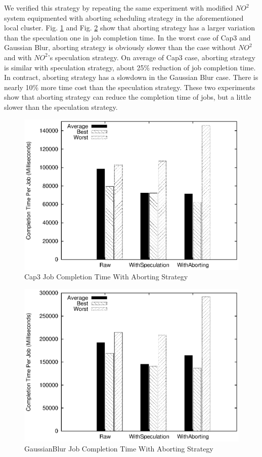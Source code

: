 We verified this strategy by repeating the same experiment with modified $NO^2$ system equipmented with aborting scheduling strategy in the aforementioned local cluster. Fig. \ref{figure:abort_completiontime_cap3} and Fig. \ref{figure:abort_completiontime_gaussianblur} show that aborting strategy has a larger variation than the speculation one in job completion time. In the worst case of Cap3 and Gaussian Blur, aborting strategy is obviously slower than the case without $NO^2$ and with $NO^2$'s speculation strategy. On average of Cap3 case, aborting strategy is similar with speculation strategy, about 25\% reduction of job completion time. In contract, aborting strategy has a slowdown in the Gaussian Blur case. There is nearly 10\% more time cost than the speculation strategy. These two experiments show that aborting strategy can reduce the completion time of jobs, but a little slower than the speculation strategy.

\begin{figure}
\centering
\includegraphics[width=0.9\columnwidth]{figures/abort_completiontime_cap3.eps}
\caption{Cap3 Job Completion Time With Aborting Strategy}
\label{figure:abort_completiontime_cap3}
\end{figure}

\begin{figure}
\centering
\includegraphics[width=0.9\columnwidth]{figures/abort_completiontime_gaussianblur.eps}
\caption{GaussianBlur Job Completion Time With Aborting Strategy}
\label{figure:abort_completiontime_gaussianblur}
\end{figure}

